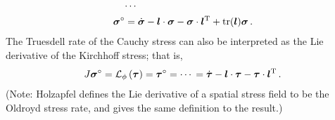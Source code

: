 \documentclass[10pt,letterpaper,oneside]{report}
\newcommand{\ten}[1]{\mbox{\boldmath $#1$}{}}
\newcommand{\scas}[1]{\mbox{{\scriptsize{${\rm{#1}}$}}}{}}
\begin{document}
\begin{itemize}
\begin{align}
\cdots{}& \notag \\
\ten{\sigma}^{\circ } 
={}& \dot{\ten{\sigma}} -  \ten{l} \cdot  \ten{\sigma} -  \ten{\sigma} \cdot \ten{l}^{\scas{T}} + \mbox{tr} (\ten{l}) \ten{\sigma} \, .
\end{align}
The Truesdell rate of the Cauchy stress can also be interpreted as the Lie derivative of the Kirchhoff stress; that is, 
\begin{align}
J \ten{\sigma}^{\circ} = \mathcal{L}_{\phi} \left( \ten{\tau} \right) = \ten{ \tau}^{\circ} 
= \cdots{} 
= \dot{ \ten{\tau} } - \ten{l} \cdot \ten{\tau} - \ten{\tau} \cdot \ten{l}^{\scas{T}} \, . 
\end{align} 
(Note: Holzapfel defines the Lie derivative of a spatial stress field to be the Oldroyd stress rate, and gives the same definition to the result.)  



\end{itemize}
\end{document}
